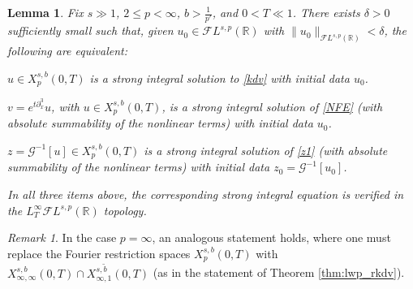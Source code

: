 \documentclass[a4paper,
11pt,  reqno]{amsart}
\newcommand{\5}{\textup{V}}
\newcommand{\noi}{\noindent}
\newcommand{\FL}{\mathcal{F} L}
\newcommand{\dx}{\partial_x}
\newtheorem{lemma}[theorem]{Lemma}
\theoremstyle{remark}
\newtheorem{remark}[theorem]{Remark}
\newcommand{\R}{\mathbb{R}}
\newcommand{\Gc}{\mathcal{G}}
\numberwithin{equation}{section}
\numberwithin{theorem}{section}
\begin{document}
\begin{lemma}\label{lem:equivalencia}
Fix $s\gg 1$, $2\le p < \infty$,  $b>\frac{1}{p'}$, and $0<T\ll 1$. There exists $\delta>0$ sufficiently small such that, given $u_0\in \FL^{s,p}(\R)$ with $\|u_0\|_{\FL^{s,p}(\R)}<\delta$, the following are equivalent:

\smallskip
\noi{\rm(i)} $u\in X^{s,b}_p(0,T)$ is a strong integral solution to  \eqref{kdv} with initial data $u_0$.

\smallskip
\noi{\rm(ii)} $v=e^{t\dx^3}u$, with $u\in X^{s,b}_p(0,T)$, is a strong integral solution of \eqref{NFE} (with absolute summability of the nonlinear terms) with initial data $u_0$.

\smallskip
\noi{\rm(iii)} $z=\Gc^{-1}[u]\in X^{s,b}_p(0,T)$ is a strong integral solution of \eqref{z1} (with absolute summability of the nonlinear terms) with initial data  $z_0=\Gc^{-1}[u_0]$.


\smallskip \noi In all three items above, the corresponding strong integral equation is verified in the $L^\infty_T\FL^{s,p}(\R)$ topology.

\end{lemma}

\begin{remark}
    In the case $p=\infty$, an analogous statement holds, where one must replace the Fourier restriction spaces $X^{s,b}_p(0,T)$ with $X^{s,b}_{\infty,\infty}(0,T) \cap X^{s,\tilde{b}}_{\infty, 1}(0,T)$ (as in the statement of Theorem \ref{thm:lwp_rkdv}).
\end{remark}
\end{document}
